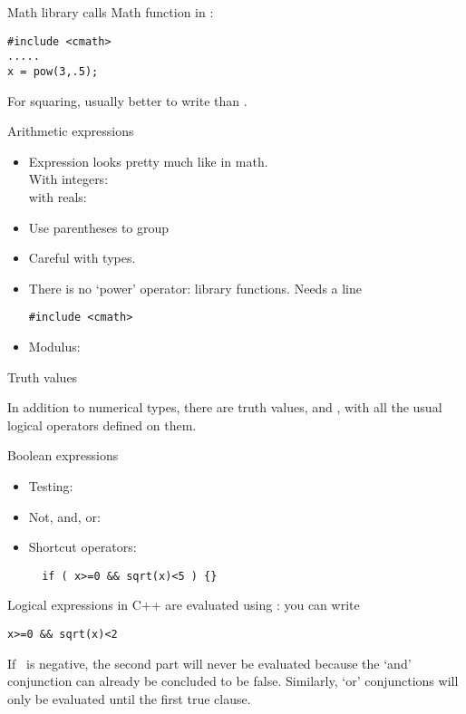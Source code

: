 \begin{block}{Math library calls}
  \label{sl:cmath}
  Math function in :
\begin{verbatim}
#include <cmath>
.....
x = pow(3,.5);
\end{verbatim}
For squaring, usually better to write  than .
\end{block}

\begin{slide}{Arithmetic expressions}
  \label{sl:arith-expr}
  \begin{itemize}
  \item
    Expression looks pretty much like in math.\\
    With integers: \\
    with reals: 
  \item Use parentheses to group 
  \item Careful with types.
  \item There is no `power' operator: library functions. Needs a line
\begin{verbatim}
#include <cmath>
\end{verbatim}
  \item Modulus: 
  \end{itemize}
\end{slide}

 {Truth values}

In addition to numerical types, there are truth values,
 and , with all the usual logical
operators defined on them.

\begin{block}{Boolean expressions}
  \label{sl:bool-expr}
  \begin{itemize}
  \item Testing: \n{== != < > <= >=}
  \item Not, and, or:   \n{! && ||}
  \item Shortcut operators:
\begin{verbatim}
  if ( x>=0 && sqrt(x)<5 ) {}
\end{verbatim}
  \end{itemize}
\end{block}

Logical expressions in C++ are evaluated using
: you can write
\begin{verbatim}
x>=0 && sqrt(x)<2
\end{verbatim}
If ~is negative, the second part will never be evaluated because
the `and' conjunction can already be concluded to be false.
Similarly, `or' conjunctions will only be evaluated until the first
true clause.

